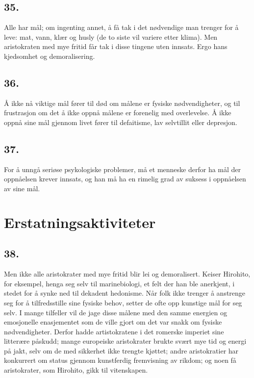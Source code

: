 \documentclass[oneside]{book}
\begin{document}
\section*{35.}
Alle har mål; om ingenting annet, å få tak i det nødvendige man trenger for å
leve: mat, vann, klær og husly (de to siste vil variere etter klima). Men
aristokraten med mye fritid får tak i disse tingene uten innsats. Ergo hans
kjedsomhet og demoralisering.

\section*{36.}
Å ikke nå viktige mål fører til død om målene er fysiske nødvendigheter, og til
frustrasjon om det å ikke oppnå målene er forenelig med overlevelse. Å ikke
oppnå sine mål gjennom livet fører til defaitisme, lav selvtillit eller
depresjon.

\section*{37.}
For å unngå seriøse psykologiske problemer, må et menneske derfor ha mål der
oppnåelsen krever innsats, og han må ha en rimelig grad av suksess i oppnåelsen
av sine mål.

\chapter{Erstatningsaktiviteter}
\section*{38.}
Men ikke alle aristokrater med mye fritid blir lei og demoralisert. Keiser
Hirohito, for eksempel, henga seg selv til marinebiologi, et felt der han ble
anerkjent, i stedet for å synke ned til dekadent hedonisme. Når folk ikke
trenger å anstrenge seg for å tilfredsstille sine fysiske behov, setter de ofte
opp kunstige mål for seg selv. I mange tilfeller vil de jage disse målene med
den samme energien og emosjonelle enasjementet som de ville gjort om det var
snakk om fysiske nødvendigheter. Derfor hadde artistokratene i det romerske
imperiet sine litterære påskudd; mange europeiske aristokrater brukte svært mye
tid og energi på jakt, selv om de med sikkerhet ikke trengte kjøttet; andre
aristokratier har konkurrert om status gjennom kunstferdig fremvisning av
rikdom; og noen få aristokrater, som Hirohito, gikk til vitenskapen.
\end{document}

